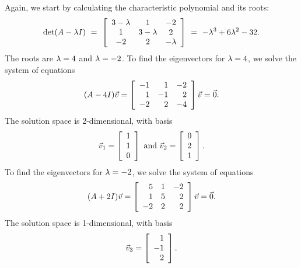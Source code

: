 \documentclass{ximera}
\begin{document}
\begin{solution}
  Again, we start by calculating the characteristic polynomial and its roots:
  \begin{equation*}
    \det(A-\eigenvar I)
    ~=~ \startmat{ccc}
      3-\eigenvar  & 1 & -2 \\
      1  & 3-\eigenvar &  2 \\
      -2 & 2 &  -\eigenvar  \\
    \stopmat
    ~=~ - \eigenvar^3 + 6\eigenvar^2 -32.
  \end{equation*}
  The roots are $\eigenvar=4$ and $\eigenvar=-2$. To find the
  eigenvectors for $\eigenvar=4$, we solve the system of equations
  \begin{equation*}
    (A-4I)\vect{v}
    =
    \startmat{rrr}
      -1  & 1 & -2 \\
      1  & -1 &  2 \\
      -2 & 2 &  -4 \\
    \stopmat\vect{v}
    = \vect{0}.
  \end{equation*}
  The solution space is 2-dimensional, with basis
  \begin{equation*}
    \vect{v}_1 = \startmat{r} 1 \\ 1 \\ 0 \stopmat
    \quad\mbox{and}\quad
    \vect{v}_2 = \startmat{r} 0 \\ 2 \\ 1 \stopmat.
  \end{equation*}
  To find the eigenvectors for $\eigenvar=-2$, we solve the system of
  equations
  \begin{equation*}
    (A+2I)\vect{v}
    =
    \startmat{rrr}
      5  & 1 & -2 \\
      1  & 5 &  2 \\
      -2 & 2 &  2 \\
    \stopmat\vect{v}
    = \vect{0}.
  \end{equation*}
  The solution space is 1-dimensional, with basis
  \begin{equation*}
    \vect{v}_3 = \startmat{r} 1 \\ -1 \\ 2 \stopmat.
  \end{equation*}


\end{solution}
\end{document}
